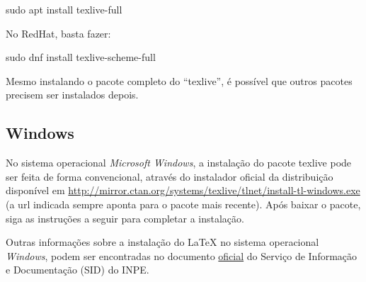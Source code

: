 \begin{commandshell}
sudo apt install texlive-full
\end{commandshell}


No RedHat, basta fazer:


\begin{commandshell}
sudo dnf install texlive-scheme-full
\end{commandshell}


\begin{marker}
Mesmo instalando o pacote completo do ``texlive'', é possível que outros pacotes precisem ser instalados depois.
\end{marker}

\subsection*{Windows}
\label{sec:windows}

No sistema operacional \textit{Microsoft Windows}, a instalação do pacote texlive pode ser feita de forma convencional, através do instalador oficial da distribuição disponível em \url{http://mirror.ctan.org/systems/texlive/tlnet/install-tl-windows.exe} (a url indicada sempre aponta para o pacote mais recente). Após baixar o pacote, siga as instruções a seguir para completar a instalação.

\begin{marker}
Outras informações sobre a instalação do \LaTeX{} no sistema operacional \textit{Windows}, podem ser encontradas no documento \href{http://mtc-m16d.sid.inpe.br/col/sid.inpe.br/mtc-m19@80/2010/03.24.15.12/doc/ambiente_latex_no_windows.pdf}{oficial} do Serviço de Informação e Documentação (SID) do INPE.
\end{marker}

